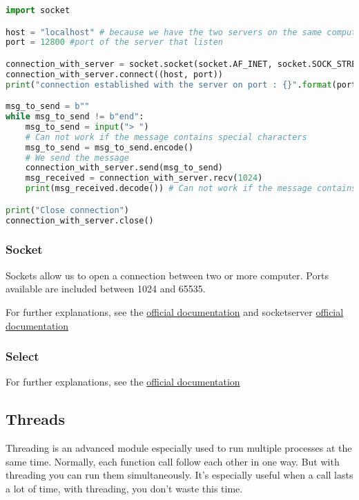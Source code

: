 \documentclass[a4paper, 12pt, titlepage]{scrartcl} %
\begin{document}
\begin{lstlisting}[language=Python]
import socket

host = "localhost" # because we have the two servers on the same computer
port = 12800 #port of the server that listen

connection_with_server = socket.socket(socket.AF_INET, socket.SOCK_STREAM)
connection_with_server.connect((host, port))
print("connection established with the server on port : {}".format(port))

msg_to_send = b""
while msg_to_send != b"end":
    msg_to_send = input("> ")
    # Can not work if the message contains special characters
    msg_to_send = msg_to_send.encode()
    # We send the message
    connection_with_server.send(msg_to_send)
    msg_received = connection_with_server.recv(1024)
    print(msg_received.decode()) # Can not work if the message contains special characters

print("Close connection")
connection_with_server.close()
\end{lstlisting} \vspace{5mm}

\subsubsection{Socket}
Sockets allow us to open a connection between two or more computer. Ports available are included between 1024 and 65535. 

\vspace{5mm}

For further explanations, see the \href{https://docs.python.org/3/library/socket.html}{official documentation} and socketserver  \href{https://docs.python.org/3/library/socketserver.html}{official documentation} 
\subsubsection{Select}
For further explanations, see the \href{https://docs.python.org/3/library/select.html}{official documentation}

\subsection{Threads}
\label{subsec:Threading}
Threading is an advanced module especially used to run multiple processes at the same time. Normally, each function call follow each other in one way. But with threading you can run them simultaneously. It's especially useful when a call lasts a lot of time, with threading, you don't waste this time.
\end{document}
